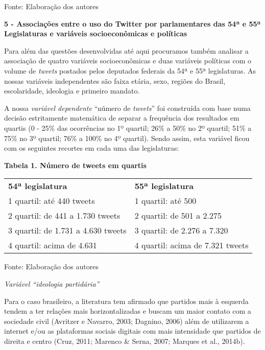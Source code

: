 Fonte: Elaboração dos autores

\textbf{5 - Associações entre o uso do Twitter por parlamentares das 54ª
e 55ª Legislaturas e variáveis socioeconômicas e políticas }

Para além das questões desenvolvidas até aqui procuramos também analisar
a associação de quatro variáveis socioeconômicas e duas variáveis
políticas com o volume de \emph{tweets} postados pelos deputados
federais da 54ª e 55ª legislaturas. As nossas variáveis independentes
são faixa etária, sexo, regiões do Brasil, escolaridade, ideologia e
primeiro mandato.

A nossa \emph{variável dependente} ``número de \emph{tweets}'' foi
construída com base numa decisão estritamente matemática de separar a
frequência dos resultados em quartis (0 - 25\% das ocorrências no 1º
quartil; 26\% a 50\% no 2º quartil; 51\% a 75\% no 3º quartil; 76\% a
100\% no 4º quartil). Sendo assim, esta variável ficou com os seguintes
recortes em cada uma das legislaturas:

\textbf{Tabela 1. Número de tweets em quartis}

\begin{longtable}[]{@{}ll@{}}
\toprule
\textbf{54ª legislatura} & \textbf{55ª legislatura}\tabularnewline
1 quartil: até 440 tweets & 1 quartil: até 500\tabularnewline
2 quartil: de 441 a 1.730 tweets & 2 quartil: de 501 a
2.275\tabularnewline
3 quartil: de 1.731 a 4.630 tweets & 3 quartil: de 2.276 a
7.320\tabularnewline
4 quartil: acima de 4.631 & 4 quartil: acima de 7.321
tweets\tabularnewline
\bottomrule
\end{longtable}

Fonte: Elaboração dos autores

\emph{Variável ``ideologia partidária''}

Para o caso brasileiro, a literatura tem afirmado que partidos mais à
esquerda tendem a ter relações mais horizontalizadas e buscam um maior
contato com a sociedade civil (Avritzer e Navarro, 2003; Dagnino, 2006)
além de utilizarem a internet e/ou as plataformas sociais digitais com
mais intensidade que partidos de direita e centro (Cruz, 2011; Marenco
\& Serna, 2007; Marques et al., 2014b).

